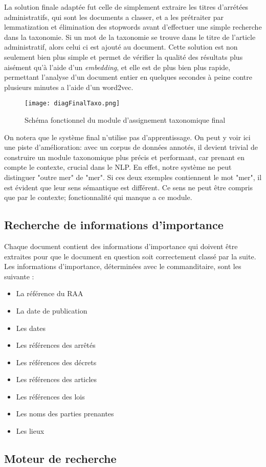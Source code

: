 La solution finale adaptée fut celle de simplement extraire les titres d'arrétées administratifs, qui sont les documents a classer, et a les prétraiter par lemmatization et élimination des stopwords avant d'effectuer une simple recherche dans la taxonomie.
Si un mot de la taxonomie se trouve dans le titre de l'article administratif, alors celui ci est ajouté au document.
Cette solution est non seulement bien plus simple et permet de vérifier la qualité des résultats plus aisément qu'à l'aide d'un \textit{embedding}, et elle est de plus bien plus rapide, permettant l'analyse d'un document entier en quelques secondes à peine contre plusieurs minutes a l'aide d'un word2vec.

\begin{figure}[h!]
  \centering
  \texttt{[image: diagFinalTaxo.png]}
	\caption[]{Schéma fonctionnel du module d'assignement taxonomique final}
  \label{taxoFinal}
\end{figure}

On notera que le système final n'utilise pas d'apprentissage.
On peut y voir ici une piste d'amélioration: avec un corpus de données annotés, il devient trivial de construire un module taxonomique plus précis et performant, car prenant en compte le contexte, crucial dans le NLP.
En effet, notre système ne peut distinguer "outre mer" de "mer". Si ces deux exemples contiennent le mot "mer", il est évident que leur sens sémantique est différent.
Ce sens ne peut être compris que par le contexte; fonctionnalité qui manque a ce module. 




\subsection{Recherche de informations d'importance} %
Chaque document contient des informations d'importance qui doivent être extraites pour que le document en question soit correctement classé par la suite.
Les informations d'importance, déterminées avec le commanditaire, sont les suivante :
\begin {itemize}
\item La référence du RAA
\item La date de publication
\item Les dates
\item Les références des arrêtés
\item Les références des décrets
\item Les références des articles
\item Les références des lois
\item Les noms des parties prenantes
\item Les lieux
\end {itemize}

 


\subsection{Moteur de recherche} %




